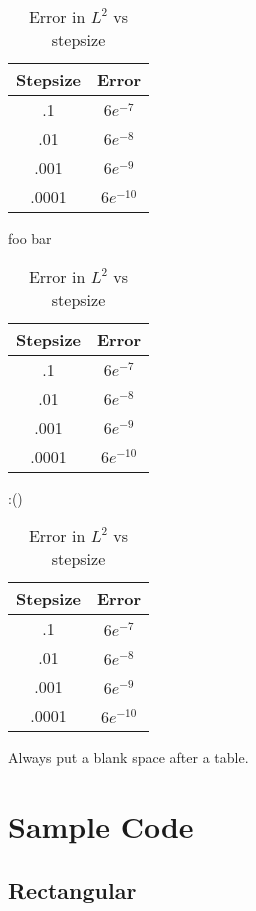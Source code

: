 \documentclass[11pt]{article}
\numberwithin{equation}{section}
\theoremstyle{definition}
\begin{document}
\begin{table}[H]
  \caption{Error in $L^2$ vs stepsize}
  \label{some_table}
  \begin{center}
  \begin{tabular}{|c|c|}
  \hline
  Stepsize & Error \\ \hline
  .1 & $6e^{-7}$ \\ \hline
  .01 & $6e^{-8}$ \\ \hline
  .001 & $6e^{-9}$ \\ \hline
  .0001 & $6e^{-10}$ \\
  \hline
  \end{tabular}
  \end{center}
\end{table}
foo bar
\begin{table}[H]
  \caption{Error in $L^2$ vs stepsize}
  \label{some_table_2}
  \begin{center}
  \begin{tabular}{|c|c|}
  \hline
  Stepsize & Error \\ \hline
  .1 & $6e^{-7}$ \\ \hline
  .01 & $6e^{-8}$ \\ \hline
  .001 & $6e^{-9}$ \\ \hline
  .0001 & $6e^{-10}$ \\
  \hline
  \end{tabular}
  \end{center}
\end{table}
:()
\begin{table}[H]
  \caption{Error in $L^2$ vs stepsize}
  \label{some_table_3}
  \begin{center}
  \begin{tabular}{|c|c|}
  \hline
  Stepsize & Error \\ \hline
  .1 & $6e^{-7}$ \\ \hline
  .01 & $6e^{-8}$ \\ \hline
  .001 & $6e^{-9}$ \\ \hline
  .0001 & $6e^{-10}$ \\
  \hline
  \end{tabular}
  \end{center}
\end{table}
Always put a blank space after a table.


\newpage
\section{Sample Code}
\subsection{Rectangular}
\lstset{caption=Rectangular Scheme}

\newpage
\end{document}
